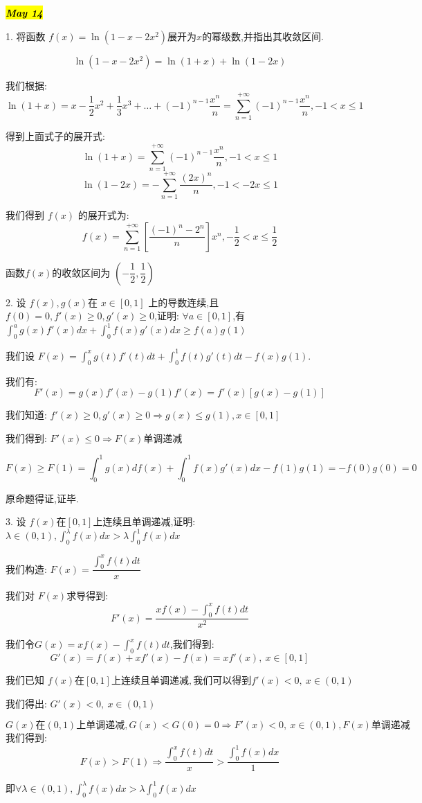 
\hl{\textbf{\textit{May 14}}}

1. 将函数 $f(x)=\ln(1-x-2x^2)$展开为$x$的幂级数,并指出其收敛区间.
\begin{solution}
	$$\ln(1-x-2x^2)=\ln(1+x)+\ln(1-2x)$$
	
	我们根据: 
	$$\ln(1+x)=x-\frac{1}{2}x^2+\frac{1}{3}x^3+\dots+(-1)^{n-1}\frac{x^n}{n}=\sum\limits_{n=1}^{+\infty}(-1)^{n-1}\frac{x^n}{n},-1<x\leq 1$$
	
	得到上面式子的展开式: 
	$$\ln(1+x)=\sum\limits_{n=1}^{+\infty}(-1)^{n-1}\frac{x^n}{n},-1<x\leq 1$$
	$$\ln(1-2x)=-\sum\limits_{n=1}^{+\infty}\frac{(2x)^n}{n},-1<-2x\leq 1$$
	
	我们得到 $f(x)$ 的展开式为: 
	$$f(x)=\sum\limits_{n=1}^{+\infty}[\frac{(-1)^n-2^n}{n}]x^n,-\frac{1}{2}<x\leq \frac{1}{2}$$
	
	函数$f(x)$的收敛区间为 $(-\dfrac{1}{2},\dfrac{1}{2})$
\end{solution}


2. 设 $f(x),g(x)$在 $x\in[0,1]$ 上的导数连续,且 $f(0)=0,f'(x)\geq 0,g'(x)\geq 0$,证明: 
$\forall a\in[0,1]$,有 $\int_{0}^{a}g(x)f'(x)dx+\int_{0}^{1}f(x)g'(x)dx\geq f(a)g(1)$
\begin{solution}
	
	我们设 $F(x)=\int_{0}^{x}g(t)f'(t)dt+\int_{0}^{1}f(t)g'(t)dt-f(x)g(1)$.
	
	我们有: $$F'(x)=g(x)f'(x)-g(1)f'(x)=f'(x)[g(x)-g(1)]$$
	
	我们知道: $f'(x)\geq 0,g'(x)\geq 0\Rightarrow g(x)\leq g(1),x\in[0,1]$
	
	我们得到: $F'(x)\leq 0\Rightarrow F(x)\text{单调递减}$
	
	$$F(x)\geq F(1)=\int_{0}^{1}g(x)df(x)+\int_{0}^{1}f(x)g'(x)dx-f(1)g(1)=-f(0)g(0)=0$$
	
	原命题得证,证毕.
\end{solution}


3. 设 $f(x)$在$[0,1]$上连续且单调递减,证明: $\lambda\in (0,1),\int_{0}^{\lambda}f(x)dx>\lambda\int_{0}^{1}f(x)dx$
\begin{solution}
	
	我们构造: $F(x)=\dfrac{\int_{0}^{x}f(t)dt}{x}$
	
	我们对 $F(x)$求导得到: 
	$$F'(x)=\frac{xf(x)-\int_{0}^{x}f(t)dt}{x^2}$$
	
	我们令$G(x)=xf(x)-\int_{0}^{x}f(t)dt$,我们得到: 
	$$G'(x)=f(x)+xf'(x)-f(x)=xf'(x),\ x\in[0,1]$$
	
	我们已知 $f(x)\text{在}[0,1]\text{上连续且单调递减},\text{我们可以得到} f'(x)<0,\ x\in(0,1)$
	
	我们得出: $G'(x)<0,\ x\in(0,1)$
	
	$G(x)\text{在}(0,1)\text{上单调递减},G(x)<G(0)=0\Rightarrow F'(x)<0,\ x\in(0,1),F(x)\text{单调递减}$
	我们得到: 
	$$F(x)>F(1)\Rightarrow \frac{\int_{0}^{x}f(t)dt}{x}>\frac{\int_{0}^{1}f(x)dx}{1}$$
	
	即$\forall \lambda\in(0,1),\int_{0}^{\lambda}f(x)dx>\lambda\int_{0}^{1}f(x)dx$
\end{solution}


